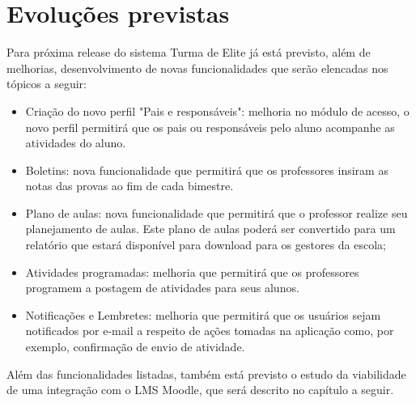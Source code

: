 \chapter{Evoluções previstas}
Para próxima release do sistema Turma de Elite já está previsto, além de melhorias, desenvolvimento de novas funcionalidades que serão elencadas nos tópicos a seguir:
\begin{itemize}
\item  Criação do novo perfil "Pais e responsáveis": melhoria no módulo de acesso, o novo perfil permitirá que os pais ou responsáveis pelo aluno acompanhe as atividades do aluno.
\item  Boletins: nova funcionalidade que permitirá que os professores insiram as notas das provas ao fim de cada bimestre.
\item  Plano de aulas: nova funcionalidade que permitirá que o professor realize seu planejamento de aulas. Este plano de aulas poderá ser convertido para um relatório que estará disponível para download para os gestores da escola;
\item  Atividades programadas: melhoria que permitirá que os professores programem a postagem de atividades para seus alunos.
\item  Notificações e Lembretes: melhoria que permitirá que os usuários sejam notificados por e-mail a respeito de ações tomadas na aplicação como, por exemplo, confirmação de envio de atividade.
\end{itemize}
Além das funcionalidades listadas, também está previsto o estudo da viabilidade de uma integração com o LMS Moodle, que será descrito no capítulo a seguir.